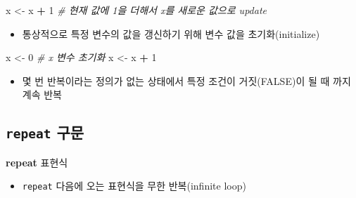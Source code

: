 \documentclass[
  11pt,
]{krantz}
\newenvironment{Shaded}{\begin{snugshade}}{\end{snugshade}}
\newcommand{\CommentTok}[1]{\textcolor[rgb]{0.37,0.37,0.37}{\textit{#1}}}
\newcommand{\ControlFlowTok}[1]{\textcolor[rgb]{0.27,0.27,0.27}{\textbf{#1}}}
\newcommand{\DecValTok}[1]{\textcolor[rgb]{0.06,0.06,0.06}{#1}}
\newcommand{\NormalTok}[1]{#1}
\newcommand{\OperatorTok}[1]{\textcolor[rgb]{0.43,0.43,0.43}{\textbf{#1}}}
\newcommand{\StringTok}[1]{\textcolor[rgb]{0.5,0.5,0.5}{#1}}
\providecommand{\tightlist}{%
  \setlength{\itemsep}{0pt}\setlength{\parskip}{0pt}}
\begin{document}
\footnotesize

\begin{Shaded}
\begin{Highlighting}[]
\NormalTok{x <-}\StringTok{ }\NormalTok{x }\OperatorTok{+}\StringTok{ }\DecValTok{1} \CommentTok{# 현재 값에 1을 더해서 x를 새로운 값으로 update}
\end{Highlighting}
\end{Shaded}

\normalsize

\begin{itemize}
\tightlist
\item
  통상적으로 특정 변수의 값을 갱신하기 위해 변수 값을 초기화(initialize)
\end{itemize}

\footnotesize

\begin{Shaded}
\begin{Highlighting}[]
\NormalTok{x <-}\StringTok{ }\DecValTok{0} \CommentTok{# x 변수 초기화}
\NormalTok{x <-}\StringTok{ }\NormalTok{x }\OperatorTok{+}\StringTok{ }\DecValTok{1}
\end{Highlighting}
\end{Shaded}

\normalsize

\begin{itemize}
\tightlist
\item
  몇 번 반복이라는 정의가 없는 상태에서 특정 조건이 거짓(FALSE)이 될 때 까지 계속 반복
\end{itemize}

\hypertarget{repeat}{%
\subsection{\texorpdfstring{\textbf{\texttt{repeat} 구문}}{repeat 구문}}\label{repeat}}

\footnotesize

\begin{Shaded}
\begin{Highlighting}[]
\ControlFlowTok{repeat}\NormalTok{ 표현식}
\end{Highlighting}
\end{Shaded}

\normalsize

\begin{itemize}
\tightlist
\item
  \texttt{repeat} 다음에 오는 표현식을 무한 반복(infinite loop)
\end{itemize}
\end{document}
